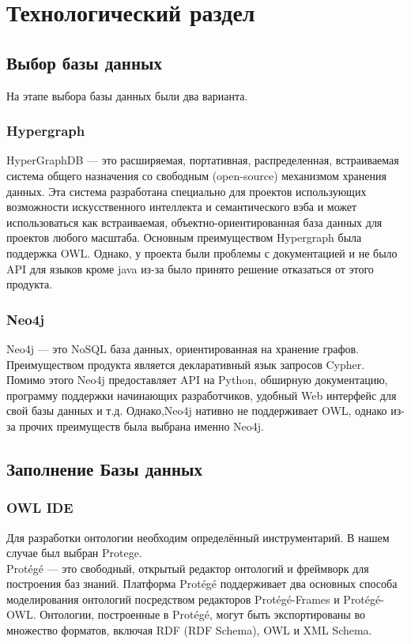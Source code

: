 \chapter{Технологический раздел}
\label{cha:impl}
\section{Выбор базы данных}
На этапе выбора базы данных были два варианта.
\subsection{Hypergraph}
HyperGraphDB — это расширяемая, портативная, распределенная, встраиваемая система общего назначения со свободным (open-source) механизмом хранения данных. Эта система разработана специально для проектов использующих возможности искусственного интеллекта и семантического вэба и может использоваться как встраиваемая, объектно-ориентированная база данных для проектов любого масштаба.\cite{HG}
Основным преимуществом Hypergraph была поддержка OWL. Однако, у проекта были проблемы с документацией и не было API для языков кроме java из-за было принято решение отказаться от этого продукта.
\subsection{Neo4j} 
Neo4j — это NoSQL база данных, ориентированная на хранение графов. Преимуществом продукта является декларативный язык запросов Cypher.\\
Помимо этого Neo4j предоставляет API на Python, обширную документацию, программу поддержки начинающих разработчиков, удобный Web интерфейс для свой базы данных и т.д. Однако,Neo4j нативно не поддерживает OWL, однако из-за прочих преимуществ была выбрана именно Neo4j. 
\section{Заполнение Базы данных}
\subsection{OWL IDE}
Для разработки онтологии необходим определённый инструментарий. В нашем случае был выбран Protege.\\
Protégé — это свободный, открытый редактор онтологий и фреймворк для построения баз знаний.
Платформа Protégé поддерживает два основных способа моделирования онтологий посредством редакторов Protégé-Frames и Protégé-OWL. Онтологии, построенные в Protégé, могут быть экспортированы во множество форматов, включая RDF (RDF Schema), OWL и XML Schema.
